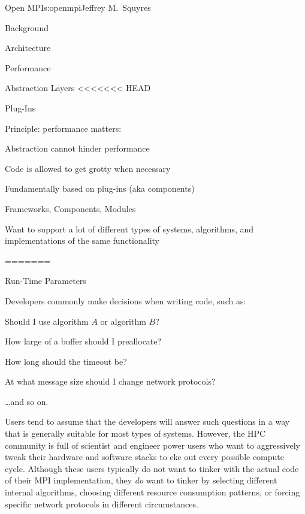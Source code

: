 \begin{aosachapter}{Open MPI}{s:openmpi}{Jeffrey M.\ Squyres}
\begin{aosasect1}{Background}
\begin{aosasect1}{Architecture}
\begin{aosasect2}{Performance}
\begin{aosasect2}{Abstraction Layers}
<<<<<<< HEAD
\begin{aosasect2}{Plug-Ins}

\begin{aosaitemize}
\item Principle: performance matters:
  \begin{aosaitemize}
  \item Abstraction cannot hinder performance
  \item Code is allowed to get grotty when necessary
  \end{aosaitemize}

\item Fundamentally based on plug-ins (aka components)
  \begin{aosaitemize}
  \item Frameworks, Components, Modules
  \item Want to support a lot of different types of systems,
    algorithms, and implementations of the same functionality
  \end{aosaitemize}

\end{aosaitemize}

=======
\begin{aosasect2}{Run-Time Parameters}

Developers commonly make decisions when writing code, such as:

\begin{aosaitemize}
\item Should I use algorithm $A$ or algorithm $B$?
\item How large of a buffer should I preallocate?
\item How long should the timeout be?
\item At what message size should I change network protocols?
\item {\ldots}and so on.
\end{aosaitemize}

Users tend to assume that the developers will answer such questions in
a way that is generally suitable for most types of systems.
%
However, the HPC community is full of scientist and engineer power
users who want to aggressively tweak their hardware and software
stacks to eke out every possible compute cycle.
%
Although these users typically do not want to tinker with the actual
code of their MPI implementation, they \emph{do} want to tinker by
selecting different internal algorithms, choosing different resource
consumption patterns, or forcing specific network protocols in
different circumstances.


\end{aosasect2}
\end{aosasect2}
\end{aosasect2}
\end{aosasect2}
\end{aosasect1}
\end{aosasect1}
\end{aosachapter}
